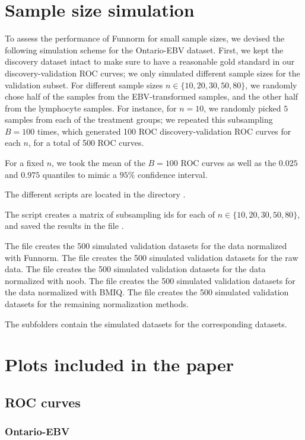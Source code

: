 \documentclass[12pt]{article}
\begin{document}
\section{Sample size simulation}

To assess the performance of Funnorm for small sample sizes, we devised the following simulation scheme for the Ontario-EBV dataset. First, we kept the discovery dataset intact to make sure to have a reasonable gold standard in our discovery-validation ROC curves; we only simulated different sample sizes for the validation subset. For different sample sizes $n \in \{10,20,30,50,80\}$, we randomly chose half of the samples from the EBV-transformed samples, and the other half from the lymphocyte samples. For instance, for $n=10$, we randomly picked $5$ samples from each of the treatment groups; we repeated this subsampling $B=100$ times, which generated 100 ROC discovery-validation ROC curves for each $n$, for a total of 500 ROC curves. 

For a fixed $n$, we took the mean of the $B=100$ ROC curves as well as the $0.025$ and $0.975$ quantiles to mimic  a $95 \%$ confidence interval. 

The different scripts are located in the directory . 

The script  creates a matrix of subsampling ids for each of $n \in \{10,20,30,50,80\}$, and saved the results in the file . 

The file  creates the 500 simulated validation datasets for the data normalized with Funnorm. The file  creates the 500 simulated validation datasets for the raw data. The file  creates the 500 simulated validation datasets for the data normalized with noob. The file  creates the 500 simulated validation datasets for the data normalized with BMIQ.  The file  creates the 500 simulated validation datasets for the remaining normalization methods. 

The subfolders  contain the simulated datasets for the corresponding datasets. 

\section{Plots included in the paper}

\subsection{ROC curves}

\subsubsection{Ontario-EBV}
\end{document}
